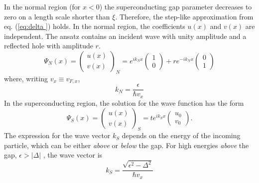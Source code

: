 In the normal region (for $x < 0$) the superconducting gap parameter decreases to zero on a length scale shorter than $\xi$. Therefore, the step-like approximation from eq. (\ref{eq:delta }) holds. In the normal region, 
the coefficients $u \left( x \right)$ and $v \left( x \right)$ are independent. The ansatz contains an incident wave with unity amplitude and a reflected hole with amplitude $r$. 
\begin{equation}
\Psi_N \left( x \right) = \begin{pmatrix} u \left( x \right) \\ v \left( x \right) \end{pmatrix}_N = e^{i k_N x } \begin{pmatrix} 1 \\ 0 \end{pmatrix} + r e^{-i k_N x } \begin{pmatrix} 0 \\ 1 \end{pmatrix}  \label{eq:psi-normal}
\end{equation}
where, writing $v_x \equiv v_{F, x}$, 
\begin{equation}
k_N = \frac{\epsilon}{\hbar v_x}
\end{equation}
In the superconducting region, the solution for the wave function has the form
\begin{equation}
\Psi_S \left( x \right) = \begin{pmatrix} u \left( x \right) \\ v \left( x \right) \end{pmatrix}_S = t e^{i k_S x } \begin{pmatrix} u_0 \\ v_0 \end{pmatrix}.
\end{equation}
The expression for the wave vector $k_S$ depends on the energy of the incoming particle, which can be either \emph{above} or \emph{below} the gap.\newline \newline
For high energies \emph{above} the gap,  $\epsilon > |\Delta|$ , the wave vector is
\begin{equation}
k_S = \frac{\sqrt{\epsilon^2 - \Delta^2}}{\hbar v_x}
\end{equation}
